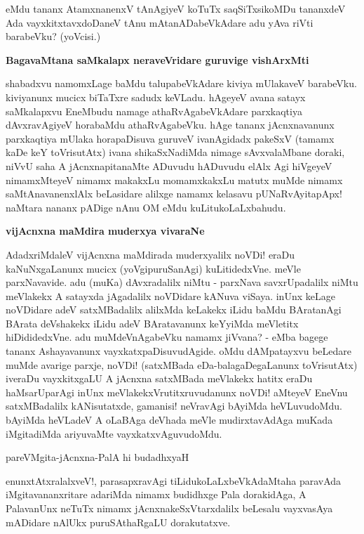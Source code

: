 \noindent
eMdu tananx AtamxnanenxV tAnAgiyeV koTuTx saqSiTxsikoMDu tananxdeV Ada vayxkitxtavxdoDaneV tAnu mAtanADabeVkAdare adu yAva riVti barabeVku? (yoVcisi.)

{\bigskip
\noindent
{\large\bf BagavaMtana saMkalapx neraveVridare guruvige vishArxMti}}\label{page71}
\medskip

\noindent
shabadxvu namomxLage baMdu talupabeVkAdare kiviya mUlakaveV barabeVku. kiviyanunx mucicx biTaTxre sadudx keVLadu. hAgeyeV avana satayx saMkalapxvu EneMbudu namage athaRvAgabeVkAdare parxkaqtiya dAvxravAgiyeV horabaMdu athaRvAgabeVku. hAge tananx jAcnxnavanunx parxkaqtiya mUlaka horapaDisuva guruveV ivanAgidadx pakeSxV (tamamx kaDe keY toVrisutAtx) ivana shikaSxNadiMda nimage sAvxvalaMbane doraki, niVvU saha A jAcnxnapitanaMte ADuvudu hADuvudu elAlx Agi hiVgeyeV nimamxMteyeV nimamx makakxLu momamxkakxLu matutx muMde nimamx saMtAnavanenxlAlx beLasidare alilxge namamx kelasavu pUNaRvAyitapApx! naMtara nananx pADige nAnu OM eMdu kuLitukoLaLxbahudu.

{\bigskip
\noindent
{\large\bf vijAcnxna maMdira muderxya vivaraNe}}
\medskip

\noindent
AdadxriMdaleV vijAcnxna maMdirada muderxyalilx noVDi! eraDu kaNuNxgaLanunx mucicx (yoVgipuruSanAgi) kuLitidedxVne. meVle parxNavavide. adu (muKa) dAvxradalilx niMtu - parxNava savxrUpadalilx niMtu meVlakekx A satayxda jAgadalilx noVDidare kANuva viSaya. inUnx keLage noVDidare adeV satxMBadalilx alilxMda keLakekx iLidu baMdu BAratanAgi BArata deVshakekx iLidu adeV BAratavanunx keYyiMda meVletitx hiDididedxVne. adu muMdeVnAgabeVku namamx jiVvana? - eMba bagege tananx Ashayavanunx vayxkatxpaDisuvudAgide. oMdu dAMpatayxvu beLedare muMde avarige parxje, noVDi! (satxMBada eDa-balagaDegaLanunx toVrisutAtx) iveraDu vayxkitxgaLU A jAcnxna satxMBada meVlakekx hatitx eraDu haMsarUparAgi inUnx meVlakekxVrutitxruvudanunx noVDi! aMteyeV EneVnu satxMBadalilx kANisutatxde, gamanisi! neVravAgi bAyiMda heVLuvudoMdu. bAyiMda heVLadeV A oLaBAga deVhada meVle mudirxtavAdAga muKada iMgitadiMda ariyuvaMte vayxkatxvAguvudoMdu.

\begin{shloka}
pareVMgita-jAcnxna-PalA hi budadhxyaH\label{page72}
\end{shloka}

\noindent
enunxtAtxralalxveV!, parasapxravAgi tiLidukoLaLxbeVkAdaMtaha paravAda iMgitavananxritare adariMda nimamx budidhxge Pala dorakidAga, A PalavanUnx neTuTx nimamx jAcnxnakeSxVtarxdalilx beLesalu vayxvasAya mADidare nAlUkx puruSAthaRgaLU dorakutatxve.

